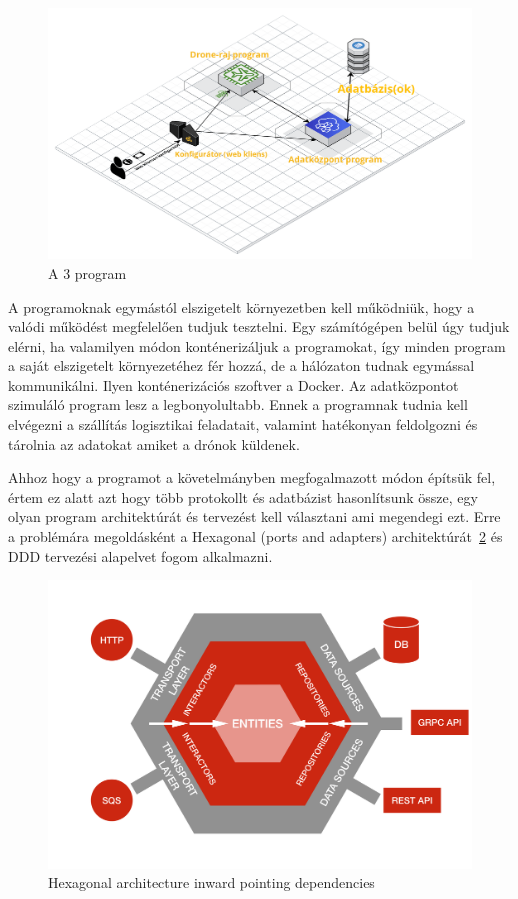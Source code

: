 \begin{figure}[h]
    \centering
    \includegraphics[scale=0.22]{images/szakdolgozat-3-program-abra.png}
    \caption{A 3 program}
    \label{fig:3program}
\end{figure}
A programoknak egymástól elszigetelt környezetben kell működniük, hogy a valódi működést megfelelően tudjuk tesztelni.
Egy számítógépen belül úgy tudjuk elérni, ha valamilyen módon konténerizáljuk a programokat, így minden program a saját elszigetelt környezetéhez fér hozzá, de a hálózaton tudnak egymással kommunikálni.
Ilyen konténerizációs szoftver a Docker.
Az adatközpontot szimuláló program lesz a legbonyolultabb.
Ennek a programnak tudnia kell elvégezni a szállítás logisztikai feladatait, valamint hatékonyan feldolgozni és tárolnia az adatokat amiket a drónok küldenek.


Ahhoz hogy a programot a követelmányben megfogalmazott módon építsük fel, értem ez alatt azt hogy több protokollt és adatbázist hasonlítsunk össze, egy olyan program architektúrát és tervezést kell választani ami megendegi ezt.
Erre a problémára megoldásként a Hexagonal (ports and adapters) architektúrát~\ref{fig:hexagonal-inward} és DDD tervezési alapelvet fogom alkalmazni.
\begin{figure}[h]
    \centering
    \includegraphics[scale=0.07]{images/hexa-inward.png}
    \caption{Hexagonal architecture inward pointing dependencies}
    \label{fig:hexagonal-inward}
\end{figure}

